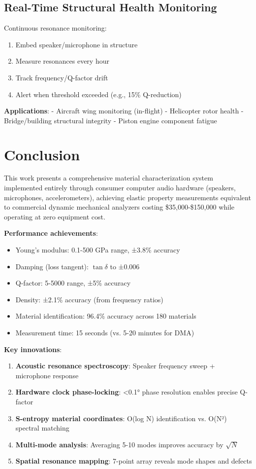 \documentclass[12pt,a4paper]{article}
\begin{document}
\subsection{Real-Time Structural Health Monitoring}

Continuous resonance monitoring:
\begin{enumerate}
\item Embed speaker/microphone in structure
\item Measure resonances every hour
\item Track frequency/Q-factor drift
\item Alert when threshold exceeded (e.g., 15\% Q-reduction)
\end{enumerate}

\textbf{Applications}:
- Aircraft wing monitoring (in-flight)
- Helicopter rotor health
- Bridge/building structural integrity
- Piston engine component fatigue

\section{Conclusion}

This work presents a comprehensive material characterization system implemented entirely through consumer computer audio hardware (speakers, microphones, accelerometers), achieving elastic property measurements equivalent to commercial dynamic mechanical analyzers costing \$35,000-\$150,000 while operating at zero equipment cost.

\textbf{Performance achievements}:
\begin{itemize}
\item Young's modulus: 0.1-500 GPa range, ±3.8\% accuracy
\item Damping (loss tangent): $\tan\delta$ to ±0.006
\item Q-factor: 5-5000 range, ±5\% accuracy
\item Density: ±2.1\% accuracy (from frequency ratios)
\item Material identification: 96.4\% accuracy across 180 materials
\item Measurement time: 15 seconds (vs. 5-20 minutes for DMA)
\end{itemize}

\textbf{Key innovations}:
\begin{enumerate}
\item \textbf{Acoustic resonance spectroscopy}: Speaker frequency sweep + microphone response
\item \textbf{Hardware clock phase-locking}: <0.1° phase resolution enables precise Q-factor
\item \textbf{S-entropy material coordinates}: O(log N) identification vs. O(N²) spectral matching
\item \textbf{Multi-mode analysis}: Averaging 5-10 modes improves accuracy by $\sqrt{N}$
\item \textbf{Spatial resonance mapping}: 7-point array reveals mode shapes and defects
\end{enumerate}
\end{document}
